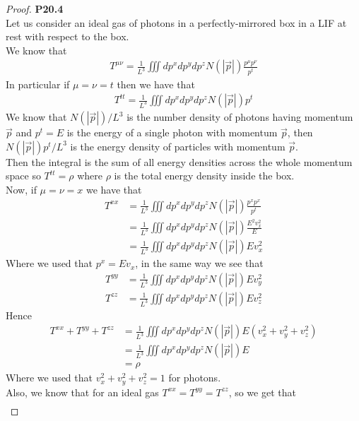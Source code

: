 \documentclass[11pt]{article}
\theoremstyle{definition}
\begin{document}
\cleardoublepage
\begin{proof}{\textbf{P20.4}}\\
Let us consider an ideal gas of photons in a perfectly-mirrored box in a LIF
at rest with respect to the box.\\
We know that
\begin{align*}
    T^{\mu\nu} = \frac{1}{L^3}\iiint dp^x dp^y dp^z N(|\vec{p}|) \frac{p^\mu p^\nu}{p^t}
\end{align*}
In particular if $\mu = \nu = t$ then we have that
\begin{align*}
    T^{tt} = \frac{1}{L^3}\iiint dp^x dp^y dp^z N(|\vec{p}|)p^t
\end{align*}
We know that $N(|\vec{p}|)/L^3$ is the number density of photons having
momentum $\vec{p}$ and $p^t = E$ is the energy of a single photon with momentum
$\vec{p}$, then $N(|\vec{p}|)p^t/L^3$ is the energy density of particles with
momentum $\vec{p}$.\\
Then the integral is the sum of all energy densities across the whole momentum
space so $T^{tt} = \rho$ where $\rho$ is the total energy density inside the box.
\\
Now, if $\mu = \nu = x$ we have that
\begin{align*}
    T^{xx}
    &= \frac{1}{L^3}\iiint dp^x dp^y dp^z N(|\vec{p}|) \frac{p^x p^x}{p^t}\\
    &= \frac{1}{L^3}\iiint dp^x dp^y dp^z N(|\vec{p}|) \frac{E^2v_x^2}{E}\\
    &= \frac{1}{L^3}\iiint dp^x dp^y dp^z N(|\vec{p}|) E v_x^2
\end{align*}
Where we used that $p^x = Ev_x$, in the same way we see that
\begin{align*}
    T^{yy} &= \frac{1}{L^3}\iiint dp^x dp^y dp^z N(|\vec{p}|) E v_y^2\\
    T^{zz} &= \frac{1}{L^3}\iiint dp^x dp^y dp^z N(|\vec{p}|) E v_z^2
\end{align*}
Hence
\begin{align*}
    T^{xx} + T^{yy} + T^{zz}
    &= \frac{1}{L^3}\iiint dp^x dp^y dp^z N(|\vec{p}|) E (v_x^2 + v_y^2 + v_z^2)\\
    &= \frac{1}{L^3}\iiint dp^x dp^y dp^z N(|\vec{p}|) E\\
    &= \rho
\end{align*}
Where we used that $v_x^2 + v_y^2 + v_z^2 = 1$ for photons.\\
Also, we know that for an ideal gas $T^{xx} = T^{yy} = T^{zz}$, so we get that
\begin{align*}

\end{align*}
\end{proof}
\end{document}
